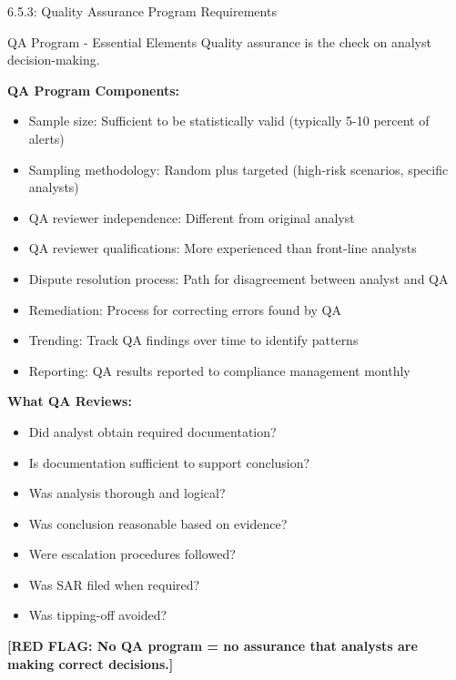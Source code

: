 \documentclass[11pt,a4paper]{beamer}
\newcommand{\redflag}[1]{\textcolor{red!80!black}{\textbf{[RED FLAG: #1]}}}
\begin{document}
\begin{frame}{6.5.3: Quality Assurance Program Requirements}
	\begin{block}{QA Program - Essential Elements}
		Quality assurance is the check on analyst decision-making.
	\end{block}
	\textbf{QA Program Components:}
	\begin{itemize}
		\item Sample size: Sufficient to be statistically valid (typically 5-10 percent of alerts)
		\item Sampling methodology: Random plus targeted (high-risk scenarios, specific analysts)
		\item QA reviewer independence: Different from original analyst
		\item QA reviewer qualifications: More experienced than front-line analysts
		\item Dispute resolution process: Path for disagreement between analyst and QA
		\item Remediation: Process for correcting errors found by QA
		\item Trending: Track QA findings over time to identify patterns
		\item Reporting: QA results reported to compliance management monthly
	\end{itemize}
	\textbf{What QA Reviews:}
	\begin{itemize}
		\item Did analyst obtain required documentation?
		\item Is documentation sufficient to support conclusion?
		\item Was analysis thorough and logical?
		\item Was conclusion reasonable based on evidence?
		\item Were escalation procedures followed?
		\item Was SAR filed when required?
		\item Was tipping-off avoided?
	\end{itemize}
	\redflag{No QA program = no assurance that analysts are making correct decisions.}
\end{frame}

\end{document}

